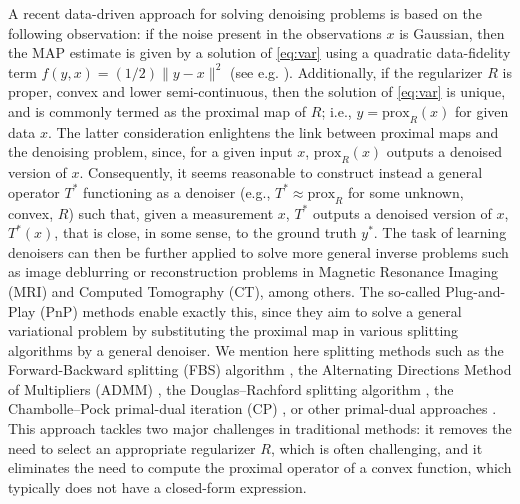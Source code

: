 \documentclass[onefignum,onetabnum]{siamonline250211}
\begin{document}
A recent data-driven approach for solving denoising problems is based on the following observation: if the noise present in the observations $x$ is Gaussian, then the MAP estimate is given by a solution of \cref{eq:var} using a quadratic data-fidelity term $f(y, x)=(1/2)\|y-x\|^2$ (see e.g. \cite{venkat2013}). Additionally, if the regularizer $R$ is proper, convex and lower semi-continuous, then the solution of \cref{eq:var} is unique, and is commonly termed as the proximal map of $R$; i.e., $y=\mathrm{prox}_R(x)$ for given data $x$. The latter consideration enlightens the link between proximal maps and the denoising problem, since, for a given input $x$, $\mathrm{prox}_R(x)$ outputs a denoised version of $x$. Consequently, it seems reasonable to construct instead a general operator $T^*$ functioning as a denoiser (e.g., $T^*\approx\mathrm{prox}_R$ for some unknown, convex, $R$) such that, given a measurement $x$, $T^*$ outputs a denoised version of $x$, $T^*(x)$, that is close, in some sense, to the ground truth $y^*$. The task of learning denoisers can then be further applied to solve more general inverse problems such as image deblurring or reconstruction problems in Magnetic Resonance Imaging (MRI) and Computed Tomography (CT), among others. The so-called Plug-and-Play (PnP) methods enable exactly this, since they aim to solve a general variational problem by substituting the proximal map in various splitting algorithms by a general denoiser. We mention here splitting methods such as the Forward-Backward splitting (FBS) algorithm \cite{ABS11,Bredies_FB,Rockafellar_FB,CW05,Gabay_FB,ggar,Tseng_FB}, the Alternating Directions Method of Multipliers (ADMM) \cite{Bot_ADMM,admm,Eckstein_ADMM,Bredies_2017}, the Douglas--Rachford splitting algorithm \cite{DR_original,EcksteinBertsekas_DR,DR_monotone,SVAITER2011}, the Chambolle--Pock primal-dual iteration (CP) \cite{Chambolle2011}, or other primal-dual approaches \cite{BrediesSun,combpesq,condat,OconnorVandenberghe}. This approach tackles two major challenges in traditional methods: it removes the need to select an appropriate regularizer $R$, which is often challenging, and it eliminates the need to compute the proximal operator of a convex function, which typically does not have a closed-form expression.
\end{document}
